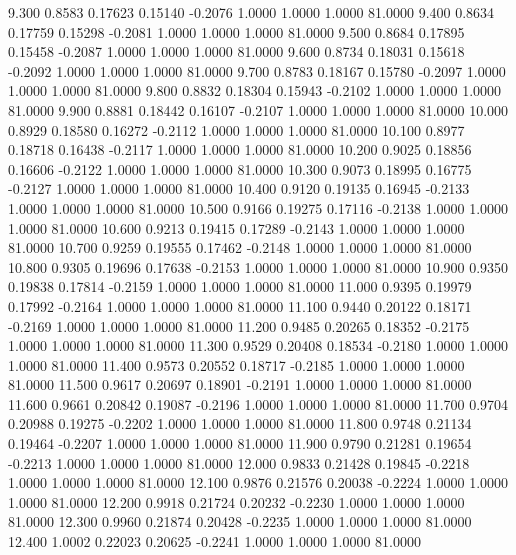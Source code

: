    9.300   0.8583   0.17623   0.15140  -0.2076   1.0000   1.0000   1.0000  81.0000
   9.400   0.8634   0.17759   0.15298  -0.2081   1.0000   1.0000   1.0000  81.0000
   9.500   0.8684   0.17895   0.15458  -0.2087   1.0000   1.0000   1.0000  81.0000
   9.600   0.8734   0.18031   0.15618  -0.2092   1.0000   1.0000   1.0000  81.0000
   9.700   0.8783   0.18167   0.15780  -0.2097   1.0000   1.0000   1.0000  81.0000
   9.800   0.8832   0.18304   0.15943  -0.2102   1.0000   1.0000   1.0000  81.0000
   9.900   0.8881   0.18442   0.16107  -0.2107   1.0000   1.0000   1.0000  81.0000
  10.000   0.8929   0.18580   0.16272  -0.2112   1.0000   1.0000   1.0000  81.0000
  10.100   0.8977   0.18718   0.16438  -0.2117   1.0000   1.0000   1.0000  81.0000
  10.200   0.9025   0.18856   0.16606  -0.2122   1.0000   1.0000   1.0000  81.0000
  10.300   0.9073   0.18995   0.16775  -0.2127   1.0000   1.0000   1.0000  81.0000
  10.400   0.9120   0.19135   0.16945  -0.2133   1.0000   1.0000   1.0000  81.0000
  10.500   0.9166   0.19275   0.17116  -0.2138   1.0000   1.0000   1.0000  81.0000
  10.600   0.9213   0.19415   0.17289  -0.2143   1.0000   1.0000   1.0000  81.0000
  10.700   0.9259   0.19555   0.17462  -0.2148   1.0000   1.0000   1.0000  81.0000
  10.800   0.9305   0.19696   0.17638  -0.2153   1.0000   1.0000   1.0000  81.0000
  10.900   0.9350   0.19838   0.17814  -0.2159   1.0000   1.0000   1.0000  81.0000
  11.000   0.9395   0.19979   0.17992  -0.2164   1.0000   1.0000   1.0000  81.0000
  11.100   0.9440   0.20122   0.18171  -0.2169   1.0000   1.0000   1.0000  81.0000
  11.200   0.9485   0.20265   0.18352  -0.2175   1.0000   1.0000   1.0000  81.0000
  11.300   0.9529   0.20408   0.18534  -0.2180   1.0000   1.0000   1.0000  81.0000
  11.400   0.9573   0.20552   0.18717  -0.2185   1.0000   1.0000   1.0000  81.0000
  11.500   0.9617   0.20697   0.18901  -0.2191   1.0000   1.0000   1.0000  81.0000
  11.600   0.9661   0.20842   0.19087  -0.2196   1.0000   1.0000   1.0000  81.0000
  11.700   0.9704   0.20988   0.19275  -0.2202   1.0000   1.0000   1.0000  81.0000
  11.800   0.9748   0.21134   0.19464  -0.2207   1.0000   1.0000   1.0000  81.0000
  11.900   0.9790   0.21281   0.19654  -0.2213   1.0000   1.0000   1.0000  81.0000
  12.000   0.9833   0.21428   0.19845  -0.2218   1.0000   1.0000   1.0000  81.0000
  12.100   0.9876   0.21576   0.20038  -0.2224   1.0000   1.0000   1.0000  81.0000
  12.200   0.9918   0.21724   0.20232  -0.2230   1.0000   1.0000   1.0000  81.0000
  12.300   0.9960   0.21874   0.20428  -0.2235   1.0000   1.0000   1.0000  81.0000
  12.400   1.0002   0.22023   0.20625  -0.2241   1.0000   1.0000   1.0000  81.0000
